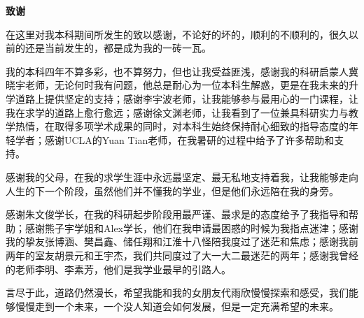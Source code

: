 \setcounter{page}{5}
\begin{center}
    \vspace{0.5ex}
    \bfseries 致谢
    \vspace{0.5ex}
\end{center}


在这里对我本科期间所发生的致以感谢，不论好的坏的，顺利的不顺利的，很久以前的还是当前发生的，都是成为我的一砖一瓦。

我的本科四年不算多彩，也不算努力，但也让我受益匪浅，感谢我的科研启蒙人冀晓宇老师，无论何时我有问题，他总是耐心为一位本科生解惑，更是在我未来的升学道路上提供坚定的支持；感谢李宇波老师，让我能够参与最用心的一门课程，让我在求学的道路上愈行愈远；感谢徐文渊老师，让我看到了一位兼具科研实力与教学热情，在取得多项学术成果的同时，对本科生始终保持耐心细致的指导态度的年轻学者；感谢UCLA的Yuan Tian老师，在我暑研的过程中给予了许多帮助和支持。

感谢我的父母，在我的求学生涯中永远最坚定、最无私地支持着我，让我能够走向人生的下一个阶段，虽然他们并不懂我的学业，但是他们永远陪在我的身旁。

感谢朱文俊学长，在我的科研起步阶段用最严谨、最求是的态度给予了我指导和帮助；感谢熊子宇学姐和Alex学长，他们在我申请最困惑的时候为我指点迷津；感谢我的挚友张博涵、樊昌鑫、储任翔和江淮十八怪陪我度过了迷茫和焦虑；感谢我前两年的室友胡景元和王宇杰，我们共同度过了大一大二最迷茫的两年；感谢我曾经的老师李明、李素芳，他们是我学业最早的引路人。

言尽于此，道路仍然漫长，希望我能和我的女朋友代雨欣慢慢探索和感受，我们能够慢慢走到一个未来，一个没人知道会如何发展，但是一定充满希望的未来。
